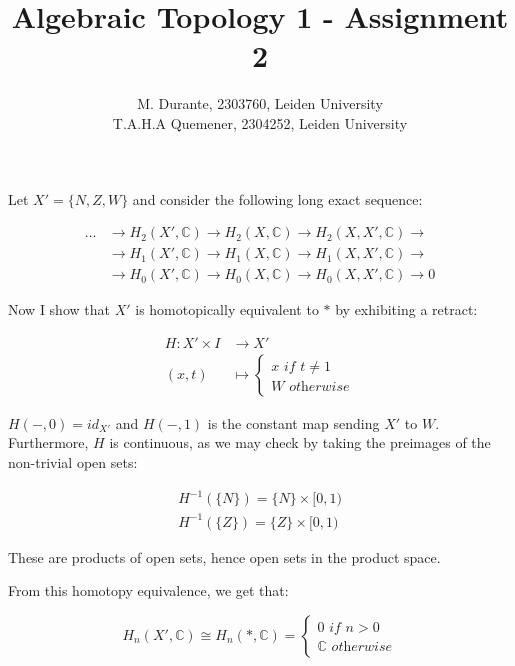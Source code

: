 \documentclass{article}
\newcommand{\numberset}{\mathbb}
\newcommand{\C}{\numberset{C}}
\newcommand{\exercise}[1]{\noindent {\bf Exercise #1}}
\begin{document}
\title{Algebraic Topology 1 - Assignment 2}

\author{M. Durante, 2303760, Leiden University\\T.A.H.A Quemener, 2304252, Leiden University}

\maketitle


\exercise{1}

Let $X'=\{N,Z,W\}$ and consider the following long exact sequence:

\begin{align*}
		\ldots & \rightarrow H_2(X',\C)\rightarrow H_2(X,\C)\rightarrow H_2(X,X',\C)\rightarrow \\
		& \rightarrow H_1(X',\C)\rightarrow H_1(X,\C)\rightarrow H_1(X,X',\C)\rightarrow \\
		& \rightarrow H_0(X',\C)\rightarrow H_0(X,\C)\rightarrow H_0(X,X',\C)\rightarrow 0
\end{align*}
		
Now I show that $X'$ is homotopically equivalent to $*$ by exhibiting a retract:

\begin{align*}
		H: X'\times I & \rightarrow X' \\
		(x,t) & \mapsto \begin{cases}
								x \textit{ if } t\neq 1 \\
								W \textit{ otherwise}
						\end{cases}
\end{align*}

$H(-,0)=id_{X'}$ and $H(-,1)$ is the constant map sending $X'$ to $W$. Furthermore, $H$ is continuous, as we may check by taking the preimages of the non-trivial open sets:

\begin{align*}
		H^{-1}(\{N\})=\{N\}\times[0,1) \\
		H^{-1}(\{Z\})=\{Z\}\times[0,1)
\end{align*}

These are products of open sets, hence open sets in the product space.

From this homotopy equivalence, we get that:

$$
H_n(X',\C)\cong H_n(*,\C)=\begin{cases}
									0 \textit{ if } n>0 \\
									\C \textit{ otherwise}
							\end{cases}
$$
\end{document}
